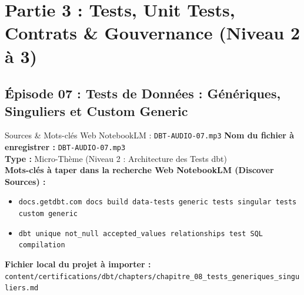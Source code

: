 \documentclass[11pt,a4paper]{article}
\begin{document}
\newpage

\section{Partie 3 : Tests, Unit Tests, Contrats \& Gouvernance (Niveau 2 à 3)}

\subsection{Épisode 07 : Tests de Données : Génériques, Singuliers et Custom Generic}
\begin{sourcebox}{Sources \& Mots-clés Web NotebookLM : \texttt{DBT-AUDIO-07.mp3}}
\textbf{Nom du fichier à enregistrer :} \texttt{DBT-AUDIO-07.mp3}\\
\textbf{Type :} Micro-Thème (Niveau 2 : Architecture des Tests dbt)\\
\textbf{Mots-clés à taper dans la recherche Web NotebookLM (Discover Sources) :}
\begin{itemize}[noitemsep]
    \item \texttt{docs.getdbt.com docs build data-tests generic tests singular tests custom generic}
    \item \texttt{dbt unique not_null accepted_values relationships test SQL compilation}
\end{itemize}
\textbf{Fichier local du projet à importer :}
\texttt{content/certifications/dbt/chapters/chapitre_08_tests_generiques_singuliers.md}
\end{sourcebox}
\end{document}
